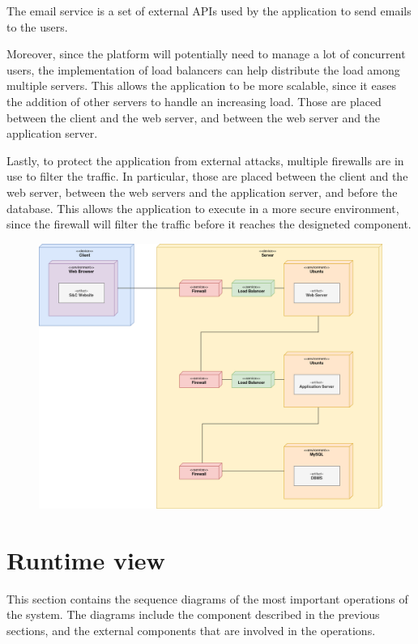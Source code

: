 The email service is a set of external APIs used by the application to send emails to the users.

Moreover, since the platform will potentially need to manage a lot of concurrent users, the implementation of load balancers can help distribute the load among multiple servers.
This allows the application to be more scalable, since it eases the addition of other servers to handle an increasing load.
Those are placed between the client and the web server, and between the web server and the application server.

Lastly, to protect the application from external attacks, multiple firewalls are in use to filter the traffic.
In particular, those are placed between the client and the web server, between the web servers and the application server, and before the database.
This allows the application to execute in a more secure environment, since the firewall will filter the traffic before it reaches the designeted component.

\begin{figure}[H]
    \centering
    \includegraphics[width=0.8\linewidth]{../../assets/deployment-diagrams/deployment-diagram.png}
\end{figure}

\section{Runtime view}

This section contains the sequence diagrams of the most important operations of the system.
The diagrams include the component described in the previous sections, and the external components that are involved in the operations.

